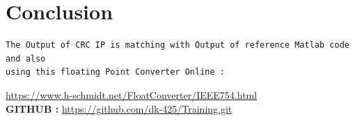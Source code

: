 \documentclass{article}
\begin{document}
\section{Conclusion}
\begin{lstlisting}
The Output of CRC IP is matching with Output of reference Matlab code and also
using this floating Point Converter Online :

\end{lstlisting}
\url{https://www.h-schmidt.net/FloatConverter/IEEE754.html}
\vspace{4cm}
\\
\textbf{GITHUB :} \url{https://github.com/dk-425/Training.git}
\end{document}
